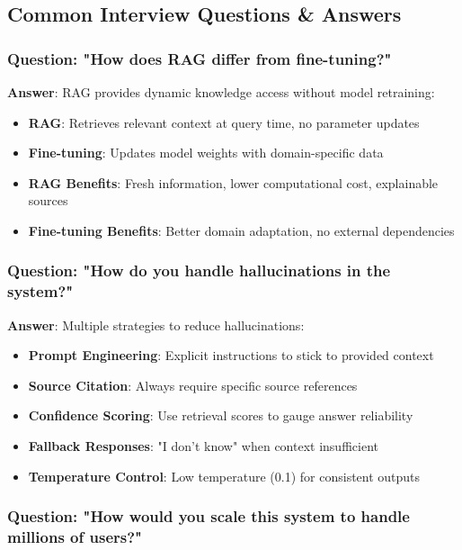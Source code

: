 \documentclass[12pt,a4paper]{article}
\begin{document}
\subsection{Common Interview Questions \& Answers}

\subsubsection{Question: "How does RAG differ from fine-tuning?"}

\textbf{Answer}: RAG provides dynamic knowledge access without model retraining:
\begin{itemize}
    \item \textbf{RAG}: Retrieves relevant context at query time, no parameter updates
    \item \textbf{Fine-tuning}: Updates model weights with domain-specific data
    \item \textbf{RAG Benefits}: Fresh information, lower computational cost, explainable sources
    \item \textbf{Fine-tuning Benefits}: Better domain adaptation, no external dependencies
\end{itemize}

\subsubsection{Question: "How do you handle hallucinations in the system?"}

\textbf{Answer}: Multiple strategies to reduce hallucinations:
\begin{itemize}
    \item \textbf{Prompt Engineering}: Explicit instructions to stick to provided context
    \item \textbf{Source Citation}: Always require specific source references
    \item \textbf{Confidence Scoring}: Use retrieval scores to gauge answer reliability
    \item \textbf{Fallback Responses}: "I don't know" when context insufficient
    \item \textbf{Temperature Control}: Low temperature (0.1) for consistent outputs
\end{itemize}

\subsubsection{Question: "How would you scale this system to handle millions of users?"}
\end{document}

